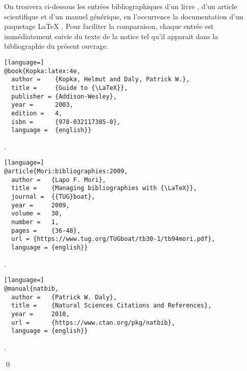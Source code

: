 \begin{exemple}
  \label{ex:bibliographie:bib}
  On trouvera ci-dessous les entrées bibliographiques d'un livre
  \citep{Kopka:latex:4e}, d'un article scientifique
  \citep{Mori:bibliographies:2009} et d'un manuel générique, en
  l'occurrence la documentation d'un paquetage {\LaTeX}
  \citep{natbib}. Pour faciliter la comparaison, chaque entrée est
  immédiatement suivie du texte de la notice tel qu'il apparait dans
  la bibliographie du présent ouvrage.

\begin{lstlisting}[language=]
@book{Kopka:latex:4e,
  author =    {Kopka, Helmut and Daly, Patrick W.},
  title =     {Guide to {\LaTeX}},
  publisher = {Addison-Wesley},
  year =      2003,
  edition =   4,
  isbn =      {978-032117385-0},
  language =  {english}}
\end{lstlisting}

  \begin{framed}
    \noindent {}.
  \end{framed}

\begin{lstlisting}[language=]
@article{Mori:bibliographies:2009,
  author =   {Lapo F. Mori},
  title =    {Managing bibliographies with {\LaTeX}},
  journal =  {{TUG}boat},
  year =     2009,
  volume =   30,
  number =   1,
  pages =    {36-48},
  url =	{https://www.tug.org/TUGboat/tb30-1/tb94mori.pdf},
  language = {english}}
\end{lstlisting}

  \begin{framed}
    \noindent {}.
  \end{framed}

\begin{lstlisting}[language=]
@manual{natbib,
  author =   {Patrick W. Daly},
  title =    {Natural Sciences Citations and References},
  year =     2010,
  url =      {https://www.ctan.org/pkg/natbib},
  language = {english}}
\end{lstlisting}

  \begin{framed}
    \noindent {}.
  \end{framed}
  \qed
\end{exemple}


